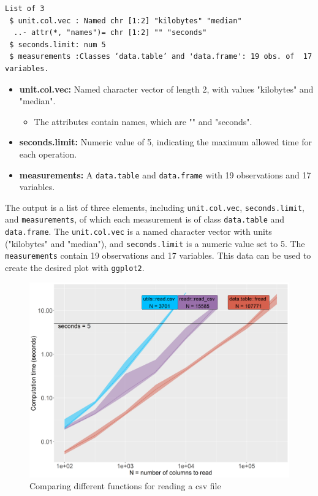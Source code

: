 \begin{verbatim}
List of 3
 $ unit.col.vec : Named chr [1:2] "kilobytes" "median"
  ..- attr(*, "names")= chr [1:2] "" "seconds"
 $ seconds.limit: num 5
 $ measurements :Classes ‘data.table’ and 'data.frame':	19 obs. of  17 variables.
\end{verbatim}

\begin{itemize}
    \item \textbf{unit.col.vec:} Named character vector of length 2, with values "kilobytes" and "median".
    \begin{itemize}
        \item The attributes contain names, which are "" and "seconds".
    \end{itemize}

    \item \textbf{seconds.limit:} Numeric value of 5, indicating the maximum allowed time for each operation.

    \item \textbf{measurements:} A \texttt{data.table} and \texttt{data.frame} with 19 observations and 17 variables.
\end{itemize}

\noindent The output is a list of three elements, including \texttt{unit.col.vec}, \texttt{seconds.limit}, and \texttt{measurements}, of which each measurement is of class \texttt{data.table} and \texttt{data.frame}. The \texttt{unit.col.vec} is a named character vector with units ("kilobytes" and "median"), and \texttt{seconds.limit} is a numeric value set to 5. The \texttt{measurements} contain 19 observations and 17 variables. This data can be used to create the desired plot with \texttt{ggplot2}.

\begin{figure}[H]
    \centering
    \includegraphics[width=0.7\linewidth]{figures/gg.read.3.png}
    \caption{Comparing different functions for reading a csv file}
    \label{fig:label2}
\end{figure}

